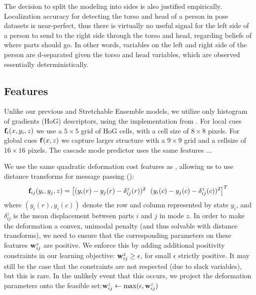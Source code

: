 The decision to split the modeling into sides is also justified empirically.  
Localization accuracy for detecting the torso and head of a person in pose
datasets is near-perfect, thus there is virtually no useful signal for the left 
side of a person to send to the right side through the torso and head, 
regarding beliefs of where parts should go.  In other words, variables on the 
left and right side of the person are d-separated given the torso and head 
variables, which are observed essentially deterministically.

\subsection{Features}

Unlike our previous \CPS and Stretchable Ensemble models, we utilize only 
histogram of gradients (HoG) descriptors, using the implementation from
\citet{dpm}.  For local cues $\mathbf{f}_i(x,y_i,z)$ we use a $5 \times 5$ grid of HoG 
cells, with a cell size of $8 \times 8$ pixels. For global cues $\mathbf{f}(x,z)$ we 
capture larger structure with a $9 \times 9$ grid and a cellsize of 
$16 \times 16$ pixels.   The cascade mode predictor uses the same features ...

 We use the same quadratic deformation cost features as \citet{felz05}, allowing us to use
distance transforms for message passing ():
$$
\mathbf{f}_{ij}(y_i,y_j,z) = \left[(y_i(r) - y_j(r) - \delta_{ij}^z(r))^2~~(y_i(c) - y_j(c) - \delta_{ij}^z(c))^2\right]^T
$$
where $(y_i(r),y_i(c))$ denote the row and column represented by state $y_i$, and $\delta_{ij}^z$ is the mean displacement between parts $i$ and $j$ in mode $z$.  In order to make the deformation a convex, unimodal penalty (and thus solvable with distance transforms), we need to ensure that the corresponding parameters on these features $\mathbf{w}_{ij}^z$ are positive. We enforce this by adding additional positivity constraints in our learning objective: $\mathbf{w}_{ij}^z \geq \epsilon$, for small $\epsilon$ strictly positive.  It may still be the case that the constraints are not respected (due to slack variables), but this is rare.  In the unlikely event that this occurs, we project the deformation parameters onto the feasible set:$\mathbf{w}_{ij}^z \leftarrow \max(\epsilon,\mathbf{w}_{ij}^z)$ 


